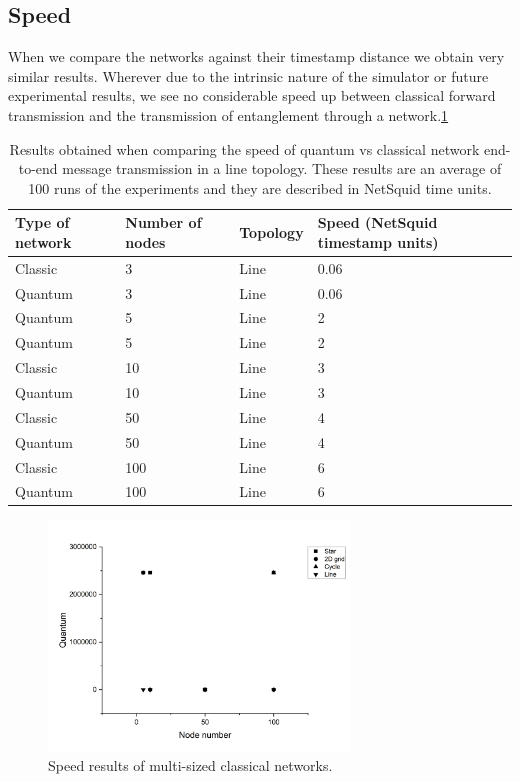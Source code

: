 \documentclass{article}
\begin{document}
    \subsection*{Speed}
    When we compare the networks against their timestamp distance we obtain very similar results. Wherever due to the intrinsic nature of the simulator or future experimental results, we see no considerable speed up between classical forward transmission and the transmission of entanglement through a network.\ref{table_speed} 
    
    \begin{table}[!h] 
    \caption{Results obtained when comparing the speed of quantum vs classical network end-to-end message transmission in a line topology. These results are an average of 100 runs of the experiments and they are described in NetSquid time units.}
    \label{table_speed} 
    \centering 
    \begin{tabular}{|l || l|  l| l|}  
    \hline 
    Type of network & Number of nodes & Topology & Speed (NetSquid timestamp units)  \\
    \hline 
    Classic & 3 & Line & 0.06\\ 
    Quantum & 3 & Line & 0.06 \\
    Quantum & 5 & Line & 2\\ 
    Quantum & 5 & Line & 2\\ 
    Classic & 10 & Line & 3\\ 
    Quantum & 10 & Line & 3\\ 
    Classic & 50 & Line & 4\\ 
    Quantum & 50 & Line & 4\\    
    Classic & 100 & Line & 6\\ 
    Quantum & 100 & Line & 6\\
    \hline 
    \end{tabular} 
    \end{table} 
    
    \begin{figure}
    \centering
    \includegraphics[width=8cm]{SQ.png}
    \caption{Speed results of multi-sized classical networks. \label{f8}} 
    \end{figure}
    
\end{document}
